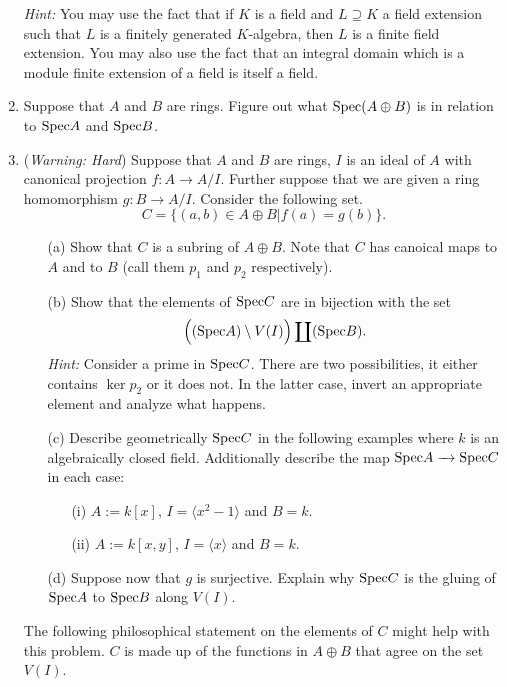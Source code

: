 \documentclass[11pt]{amsart}
\theoremstyle{theorem}
\renewcommand{\to}[1][]{\xrightarrow{\ #1\ }}
\newcommand{\Spec}{\textnormal{Spec}}
\begin{document}
\begin{enumerate}
    \vskip 3pt
\emph{Hint:} You may use the fact that if $K$ is a field and $L \supseteq K$ a field extension such that $L$ is a finitely generated $K$-algebra, then $L$ is a finite field extension.  You may also use the fact that an integral domain which is a module finite extension of a field is itself a field.
\item Suppose that $A$ and $B$ are rings.  Figure out what $\Spec (A \oplus B)$ is in relation to $\Spec A$ and $\Spec B$.
\item (\emph{Warning: Hard}) Suppose that $A$ and $B$ are rings, $I$ is an ideal of $A$ with canonical projection $f : A \to A/I$.  Further suppose that we are given a ring homomorphism $g : B \to A/I$.  Consider the following set.
\[
C = \{ (a,b) \in A \oplus B | f(a) = g(b) \}.
\]
\begin{itemize}
\item[(a)]  Show that $C$ is a subring of $A \oplus B$.  Note that $C$ has canoical maps to $A$ and to $B$ (call them $p_1$ and $p_2$ respectively).
\item[(b)]  Show that the elements of $\Spec C$ are in bijection with the set
\[
\Big( (\Spec A) \setminus V(I) \Big) \coprod (\Spec B).
\]
\emph{Hint: } Consider a prime in $\Spec C$.  There are two possibilities, it either contains $\ker p_2$ or it does not.  In the latter case, invert an appropriate element and analyze what happens.
\item[(c)]  Describe geometrically $\Spec C$ in the following examples where $k$ is an algebraically closed field.  Additionally describe the map $\Spec A \to \Spec C$ in each case:
\begin{itemize}
\item[(i)]  $A := k[x]$, $I = \langle x^2 - 1 \rangle$ and $B = k$.
\item[(ii)]  $A := k[x,y]$, $I = \langle x \rangle$ and $B = k$.
\end{itemize}
\item[(d)]  Suppose now that $g$ is surjective.  Explain why $\Spec C$ is the gluing of $\Spec A$ to $\Spec B$ along $V(I)$.
\end{itemize}
The following philosophical statement on the elements of $C$ might help with this problem.  $C$ is made up of the functions in $A \oplus B$ that agree on the set $V(I)$.
\end{enumerate}
\end{document}

